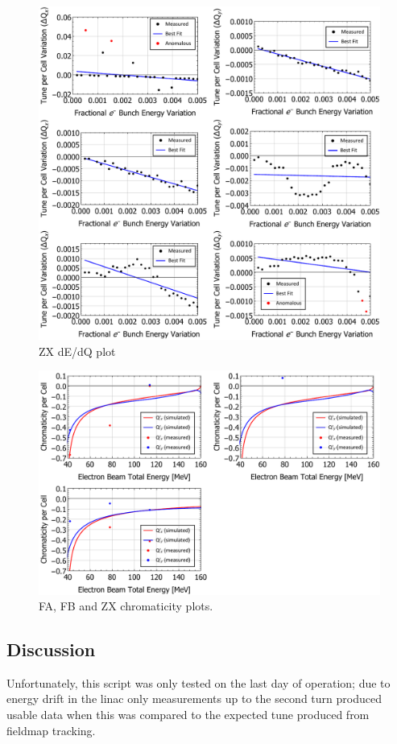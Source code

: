 \documentclass[../main.tex]{subfiles}
\begin{document}
\begin{figure}[!h]
\centering
\includegraphics[width=\textwidth]{Figures/CBETA_Multi-Pass_Commissioning/chromaticity/ZX_analysed_3turn_dEedQ.pdf}
\caption{ZX dE/dQ plot}
\label{fig:ZX_dEdQ}
\end{figure}

\begin{figure}[!h]
\centering
\includegraphics[width=\textwidth]{Figures/CBETA_Multi-Pass_Commissioning/chromaticity/FAFBZX_chromaticity.pdf}
\caption{FA, FB and ZX chromaticity plots.}
\end{figure}

\subsection{Discussion}
\label{sec:chromaticity_discussion}

Unfortunately, this script was only tested on the last day of operation; due to energy drift in the linac only measurements
up to the second turn produced usable data when this was compared to the expected tune produced from fieldmap tracking.
\end{document}
